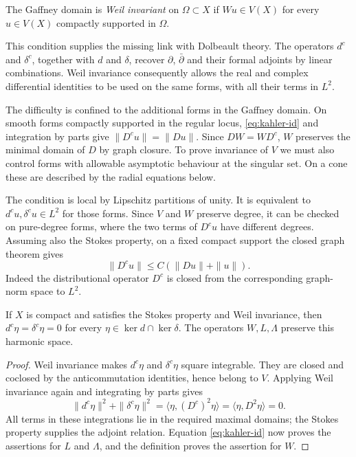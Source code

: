 \begin{definition}\label{def:WI}
The Gaffney domain is \emph{Weil invariant} on $\Omega\subset X$
if $Wu\in V(X)$ for every $u\in V(X)$ compactly supported in
$\Omega$.
\end{definition}

This condition supplies the missing link with Dolbeault theory.
The operators $d^c$ and $\delta^c$, together with $d$ and
$\delta$, recover $\partial$, $\bar\partial$ and their formal
adjoints by linear combinations. Weil invariance consequently
allows the real and complex differential identities to be used on
the same forms, with all their terms in $L^2$.

The difficulty is confined to the additional forms in the Gaffney
domain. On smooth forms compactly supported in the regular locus,
\eqref{eq:kahler-id} and integration by parts give
$\|D^cu\|=\|Du\|$. Since $DW=WD^c$, $W$ preserves the
minimal domain of $D$ by graph closure. To prove invariance of $V$
we must also control forms with allowable asymptotic behaviour at
the singular set. On a cone these are described by the radial
equations below.

The condition is local by Lipschitz partitions of unity. It is
equivalent to $d^cu,\delta^cu\in L^2$ for those forms. Since $V$
and $W$ preserve degree, it can be checked on pure-degree forms,
where the two terms of $D^cu$ have different degrees. Assuming
also the Stokes property, on a fixed compact support the closed
graph theorem gives
\begin{equation}\label{eq:WI-estimate}
 \|D^cu\|\le C(\|Du\|+\|u\|).
\end{equation}
Indeed the distributional operator $D^c$ is closed from the
corresponding graph-norm space to $L^2$.

\begin{proposition}\label{prop:global}
If $X$ is compact and satisfies the Stokes property and Weil
invariance, then $d^c\eta=\delta^c\eta=0$ for every
$\eta\in\ker d\cap\ker\delta$. The operators $W,L,\Lambda$
preserve this harmonic space.
\end{proposition}
\begin{proof}
Weil invariance makes $d^c\eta$ and $\delta^c\eta$ square
integrable. They are closed and coclosed by the anticommutation
identities, hence belong to $V$. Applying Weil invariance again
and integrating by parts gives
\[
 \|d^c\eta\|^2+\|\delta^c\eta\|^2
 =\langle\eta,(D^c)^2\eta\rangle
 =\langle\eta,D^2\eta\rangle=0.
\]
All terms in these integrations lie in the required maximal domains;
the Stokes property supplies the adjoint relation. Equation
\eqref{eq:kahler-id} now proves the assertions for $L$ and
$\Lambda$, and the definition proves the assertion for $W$.
\end{proof}

